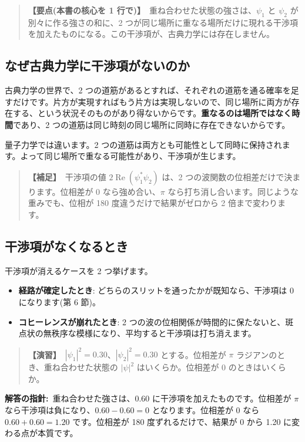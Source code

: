 \documentclass{article}
\begin{document}
\begin{quote}
\textbf{【要点(本書の核心を 1 行で)】}\ 重ね合わせた状態の強さは、\(\psi_1\) と \(\psi_2\) が別々に作る強さの和に、2 つが同じ場所に重なる場所だけに現れる干渉項を加えたものになる。この干渉項が、古典力学には存在しません。
\end{quote}

\subsection{なぜ古典力学に干渉項がないのか}

古典力学の世界で、2 つの道筋があるとすれば、それぞれの道筋を通る確率を足すだけです。片方が実現すればもう片方は実現しないので、同じ場所に両方が存在する、という状況そのものがあり得ないからです。\textbf{重なるのは場所ではなく時間}であり、2 つの道筋は同じ時刻の同じ場所に同時に存在できないからです。

量子力学では違います。2 つの道筋は両方とも可能性として同時に保持されます。よって同じ場所で重なる可能性があり、干渉項が生じます。

\begin{quote}
\textbf{【補足】}\ 干渉項の値 \(2\operatorname{Re}(\psi_1^{*}\psi_2)\) は、2 つの波関数の位相差だけで決まります。位相差が 0 なら強め合い、\(\pi\) なら打ち消し合います。同じような重みでも、位相が 180 度違うだけで結果がゼロから 2 倍まで変わります。
\end{quote}

\subsection{干渉項がなくなるとき}

干渉項が消えるケースを 2 つ挙げます。
\begin{itemize}
\item \textbf{経路が確定したとき}: どちらのスリットを通ったかが既知なら、干渉項は 0 になります(第 6 節)。
\item \textbf{コヒーレンスが崩れたとき}: 2 つの波の位相関係が時間的に保たないと、斑点状の無秩序な模様になり、平均すると干渉項は打ち消えます。
\end{itemize}

\begin{quote}
\textbf{【演習】}\ \(|\psi_1|^2 = 0.30\)、\(|\psi_2|^2 = 0.30\) とする。位相差が \(\pi\) ラジアンのとき、重ね合わせた状態の \(|\psi|^2\) はいくらか。位相差が 0 のときはいくらか。
\end{quote}

\textbf{解答の指針:}\ 重ね合わせた強さは、0.60 に干渉項を加えたものです。位相差が \(\pi\) なら干渉項は負になり、\(0.60 - 0.60 = 0\) となります。位相差が 0 なら \(0.60 + 0.60 = 1.20\) です。位相差が 180 度ずれるだけで、結果が 0 から 1.20 に変わる点が本質です。
\end{document}

